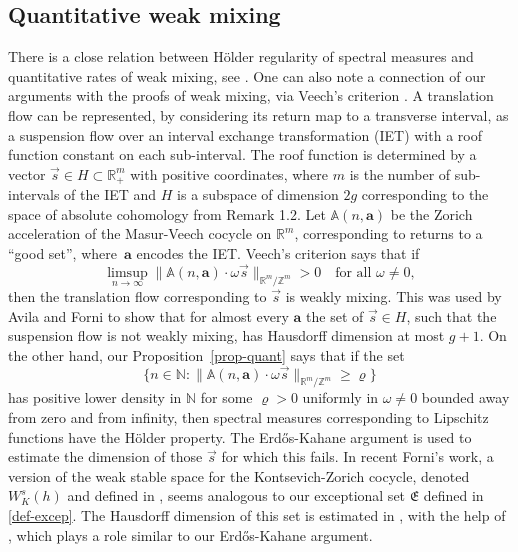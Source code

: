\documentclass[JEP,XML,SOM,Unicode]{cedram}
\newcommand{\sep}{:}
\theoremstyle{plain}
\theoremstyle{definition}
\newcommand\bom{{\boldsymbol a}}\let\ba\bom
\let\om\omega
\newcommand\Fre{\mathfrak{E}}
\newcommand\Aa{\mathbb{A}}
\newcommand{\R}{\mathbb{R}}
\newcommand{\Z}{\mathbb{Z}}
\newcommand{\N}{\mathbb{N}}
\begin{document}
\subsection{Quantitative weak mixing} There is a close relation between Hölder regularity of spectral measures and quantitative rates of weak mixing, see \cite{BuSo18b,Forni2}. One can also note a connection of our arguments with the proofs of weak mixing, via Veech's criterion \cite{veechamj}. A translation flow can be represented, by considering its return map to a transverse interval, as a suspension flow over an interval exchange transformation (IET) with a roof function constant on each sub-interval. The roof function is determined by a vector $\vec s\in H\subset \R^m_+$ with positive coordinates, where $m$ is the number of sub-intervals of the IET and $H$ is a subspace of dimension $2g$ corresponding to the space of absolute cohomology from Remark 1.2. Let $\Aa(n,\bom)$ be the Zorich acceleration of the Masur-Veech cocycle on $\R^m$, corresponding to returns to a ``good set'', where~$\bom$ encodes the IET. Veech's criterion \cite[\S 7]{veechamj} says that if\vspace*{-3pt}
\[
\limsup_{n\to \infty} \|\Aa(n,\bom)\cdot \om \vec{s}\|_{\R^m/\Z^m}>0\quad \text{for all }\om\ne 0,
\]
then the translation flow corresponding to $\vec s$ is weakly mixing. This was used by Avila and Forni \cite[Th.\,A.2]{AF} to show that for almost every $\bom$ the set of $\vec s\in H$, such that the suspension flow is not weakly mixing, has Hausdorff dimension at most $g+1$. On the other hand, our Proposition~\ref{prop-quant} says that if the set\vspace*{-3pt}
\[
\{n\in \N\sep \|\Aa(n,\bom)\cdot \om \vec{s}\|_{\R^m/\Z^m} \ge \varrho\}
\]
has positive lower density in $\N$ for some $\varrho>0$ uniformly in $\om\ne 0$ bounded away from zero and from infinity, then spectral measures corresponding to Lipschitz functions have the Hölder property. The Erd\H{o}s-Kahane argument is used to estimate the dimension of those $\vec s$ for which this fails.
In recent Forni's work, a version of the weak stable space for the Kontsevich-Zorich cocycle, denoted $W_K^s(h)$ and defined in \cite[\S6]{Forni2}, seems analogous to our exceptional set $\Fre$ defined in \eqref{def-excep}. The Hausdorff dimension of this set is estimated in \cite[Th.\,6.3]{Forni2}, with the help of \cite[Lem.\,6.2]{Forni2}, which plays a role similar to our Erd\H{o}s-Kahane argument.
\end{document}
